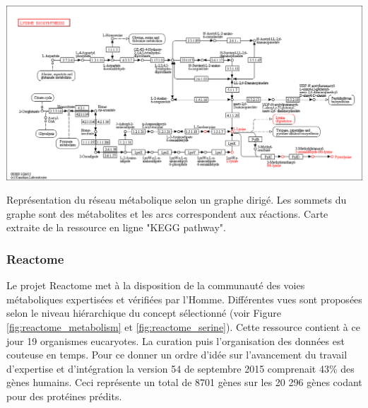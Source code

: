 \begin{refsegment}
    \begin{shadedfigure}
        \centering
        \includegraphics[width=\textwidth]{img/kegg_lysine.png}
        \caption{ Représentation du réseau métabolique selon un graphe dirigé. Les sommets du graphe sont des métabolites et les arcs correspondent aux réactions. Carte extraite de la ressource en ligne "KEGG pathway". }
        \label{fig:kegg_lysine}
    \end{shadedfigure}
    
    \subsubsection{Reactome}
    Le projet Reactome \cite{joshi2005reactome,matthews2009reactome,croft2010reactome,croft2014reactome,fabregat2016reactome} met à la disposition de la communauté des voies métaboliques expertisées et vérifiées par l'Homme. Différentes vues sont proposées selon le niveau hiérarchique du concept sélectionné (voir Figure \ref{fig:reactome_metabolism} et \ref{fig:reactome_serine}). Cette ressource contient à ce jour 19 organismes eucaryotes. La curation puis l'organisation des données est couteuse en temps. Pour ce donner un ordre d'idée sur l'avancement du travail d'expertise et d'intégration la version 54 de septembre 2015 comprenait 43\% des gènes humains. Ceci représente un total de 8701 gènes sur les 20 296 gènes codant pour des protéines prédits.
    

\end{refsegment}
